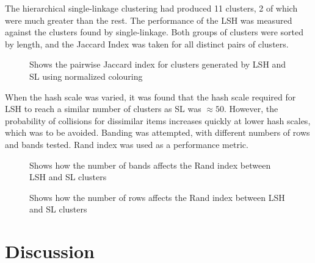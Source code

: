 \documentclass[times, twoside, watermark]{zHenriquesLab-StyleBioRxiv}
\begin{document}
The hierarchical single-linkage clustering had produced 11 clusters, 2 of which were much greater than the rest. The performance of the LSH was measured against the clusters found by single-linkage. Both groups of clusters were sorted by length, and the Jaccard Index was taken for all distinct pairs of clusters. \\

\begin{figure}[!h]
    
    \caption{Shows the pairwise Jaccard index for clusters generated by LSH and SL using normalized colouring}
    \label{LSH_SL}
\end{figure}

When the hash scale was varied, it was found that the hash scale required for LSH to reach a similar number of clusters as SL was $\approx 50$. However, the probability of collisions for dissimilar items increases quickly at lower hash scales, which was to be avoided. Banding was attempted, with different numbers of rows and bands tested. Rand index was used as a performance metric. 

\begin{figure}[!h]
    
    \caption{Shows how the number of bands affects the Rand index between LSH and SL clusters}
    \label{bandsRandindex}
\end{figure}

\begin{figure}[!h]
    
    \caption{Shows how the number of rows affects the Rand index between LSH and SL clusters}
    \label{rowsRandindex}
\end{figure}




\section*{Discussion}
\end{document}

